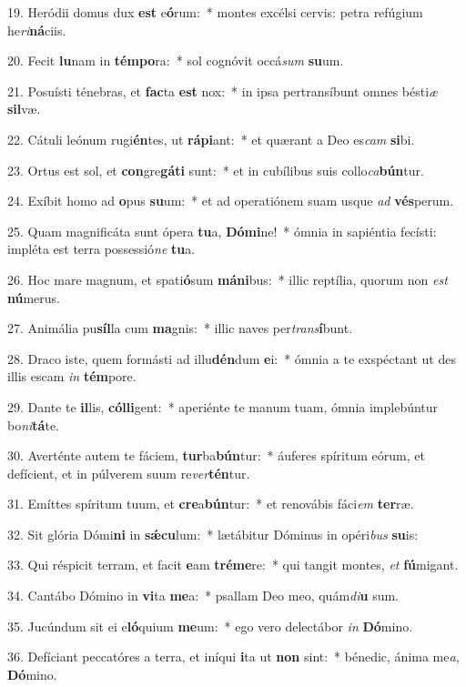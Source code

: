 19. Heródii domus dux \textbf{est} e\textbf{ó}rum:~*  montes excélsi cervis: petra refúgium he\textit{ri}\textbf{ná}ciis.\

20. Fecit \textbf{lu}nam in \textbf{tém}\textbf{po}ra:~*  sol cognóvit occá\textit{sum} \textbf{su}um.\

21. Posuísti ténebras, et \textbf{fac}ta \textbf{est} nox:~*  in ipsa pertransíbunt omnes bésti\textit{æ} \textbf{sil}væ.\

22. Cátuli leónum rugi\textbf{én}tes, ut \textbf{rá}\textbf{pi}ant:~*  et quærant a Deo es\textit{cam} \textbf{si}bi.\

23. Ortus est sol, et \textbf{con}gre\textbf{gá}\textbf{ti} sunt:~*  et in cubílibus suis collo\textit{ca}\textbf{bún}tur.\

24. Exíbit homo ad \textbf{o}pus \textbf{su}um:~*  et ad operatiónem suam usque \textit{ad} \textbf{vés}perum.\

25. Quam magnificáta sunt ópera \textbf{tu}a, \textbf{Dó}\textbf{mi}ne!~*  ómnia in sapiéntia fecísti: impléta est terra possessió\textit{ne} \textbf{tu}a.\

26. Hoc mare magnum, et spati\textbf{ó}sum \textbf{má}\textbf{ni}bus:~*  illic reptília, quorum non \textit{est} \textbf{nú}merus.\

27. Animália pu\textbf{síl}la cum \textbf{ma}gnis:~*  illic naves per\textit{trans}\textbf{í}bunt.\

28. Draco iste, quem formásti ad illu\textbf{dén}dum \textbf{e}i:~*  ómnia a te exspéctant ut des illis escam \textit{in} \textbf{tém}pore.\

29. Dante te \textbf{il}lis, \textbf{cól}\textbf{li}gent:~*  aperiénte te manum tuam, ómnia implebúntur bo\textit{ni}\textbf{tá}te.\

30. Averténte autem te fáciem, \textbf{tur}ba\textbf{bún}tur:~*  áuferes spíritum eórum, et defícient, et in púlverem suum re\textit{ver}\textbf{tén}tur.\

31. Emíttes spíritum tuum, et \textbf{cre}a\textbf{bún}tur:~*  et renovábis fáci\textit{em} \textbf{ter}ræ.\

32. Sit glória Dómi\textbf{ni} in \textbf{sǽ}\textbf{cu}lum:~*  lætábitur Dóminus in opéri\textit{bus} \textbf{su}is:\

33. Qui réspicit terram, et facit \textbf{e}am \textbf{tré}\textbf{me}re:~*  qui tangit montes, \textit{et} \textbf{fú}migant.\

34. Cantábo Dómino in \textbf{vi}ta \textbf{me}a:~*  psallam Deo meo, quám\textit{di}\textbf{u} sum.\

35. Jucúndum sit ei e\textbf{ló}quium \textbf{me}um:~*  ego vero delectábor \textit{in} \textbf{Dó}mino.\

36. Defíciant peccatóres a terra, et iníqui \textbf{i}ta ut \textbf{non} sint:~*  bénedic, ánima me\textit{a}, \textbf{Dó}mino.\

